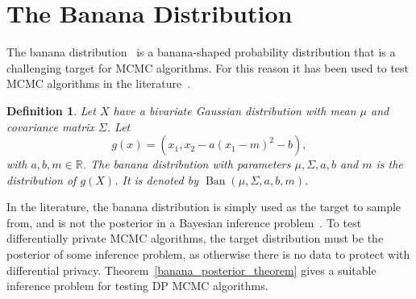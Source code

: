 \documentclass[english,twoside,openright]{HYgraduMLDS}
\newtheorem{definition}{Definition}
\newcommand{\R}{\mathbb{R}}
\DeclareMathOperator{\ban}{Ban}
\begin{document}
\section{The Banana Distribution}

The banana distribution~\cite{TPK14} is a banana-shaped probability 
distribution that is a challenging target for MCMC algorithms. For this reason it has 
been used to test MCMC algorithms in the literature~\cite{TPK14}. 

\begin{definition}
    Let \(X\) have a bivariate Gaussian distribution with
    mean \(\mu\) and covariance matrix \(\Sigma\). Let
    \[
        g(x) = (x_1, x_2 - a(x_1 - m)^2 - b),
    \]
    with \(a, b, m \in \R\).
    The banana distribution with parameters \(\mu, \Sigma, a, b\) and \(m\)
    is the distribution of \(g(X)\). It is denoted by 
    \(\ban(\mu, \Sigma, a, b, m)\).
\end{definition}

In the literature, the banana distribution is simply used as the target to 
sample from, and is not the posterior in a Bayesian inference 
problem~\cite{TPK14}. To test differentially private MCMC algorithms, the 
target distribution must be the posterior of some inference problem, as 
otherwise there is no data to protect with differential privacy.
Theorem~\ref{banana_posterior_theorem} gives a suitable inference problem 
for testing DP MCMC algorithms.
\end{document}

